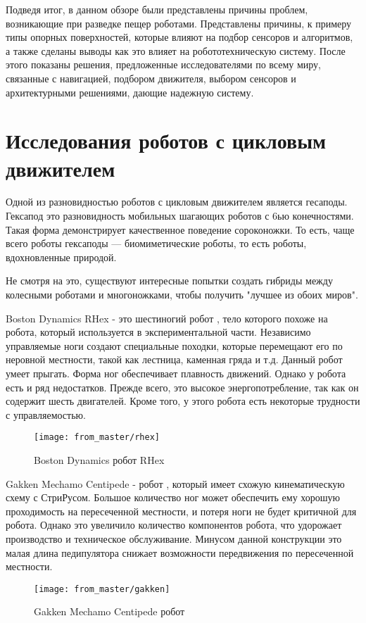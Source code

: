 Подведя итог, в данном обзоре были представлены причины проблем, возникающие при разведке пещер роботами. Представлены причины, к примеру типы опорных поверхностей, которые влияют на подбор сенсоров и алгоритмов, а также сделаны выводы как это влияет на робототехническую систему. После этого показаны решения, предложенные исследователями по всему миру, связанные с навигацией, подбором движителя, выбором сенсоров и архитектурными решениями, дающие надежную систему. 

\section{Исследования роботов с цикловым движителем}
Одной из разновидностью роботов с цикловым движителем является гесаподы. Гексапод это разновидность мобильных шагающих роботов с 6ью конечностями. Такая форма демонстрирует качественное поведение сороконожки. То есть, чаще всего роботы гексаподы --- биомиметические роботы, то есть роботы, вдохновленные природой.

Не смотря на это, существуют интересные попытки создать гибриды между колесными роботами и многоножками, чтобы получить "лучшее из обоих миров".

Boston Dynamics RHex \cite{Altendorfer2001} - это шестиногий робот , тело которого похоже на робота, который используется в экспериментальной части. Независимо управляемые ноги создают специальные походки, которые перемещают его по неровной местности, такой как лестница, каменная гряда и т.д. Данный робот умеет прыгать. Форма ног обеспечивает плавность движений. Однако у робота есть и ряд недостатков. Прежде всего, это высокое энергопотребление, так как он содержит шесть двигателей. Кроме того, у этого робота есть некоторые трудности с управляемостью. 

\begin{figure}[H]
    \centering\texttt{[image: from\_master/rhex]}\\
    \caption{Boston Dynamics робот RHex}
    \label{fig:rhex}
    \end{figure}

Gakken Mechamo Centipede \cite{millerExtremeMakeoverHeianera2008, Miller2019} - робот , который имеет схожую кинематическую схему с СтриРусом. Большое количество ног может обеспечить ему хорошую проходимость на пересеченной местности, и потеря ноги не будет критичной для робота. Однако это увеличило количество компонентов робота, что удорожает производство и техническое обслуживание. Минусом данной конструкции это малая длина педипулятора снижает возможности передвижения по пересеченной местности.
\begin{figure}[H]
    \centering\texttt{[image: from\_master/gakken]}\\
    \caption{Gakken Mechamo Centipede робот}
    \label{fig:gakken}
    \end{figure}

